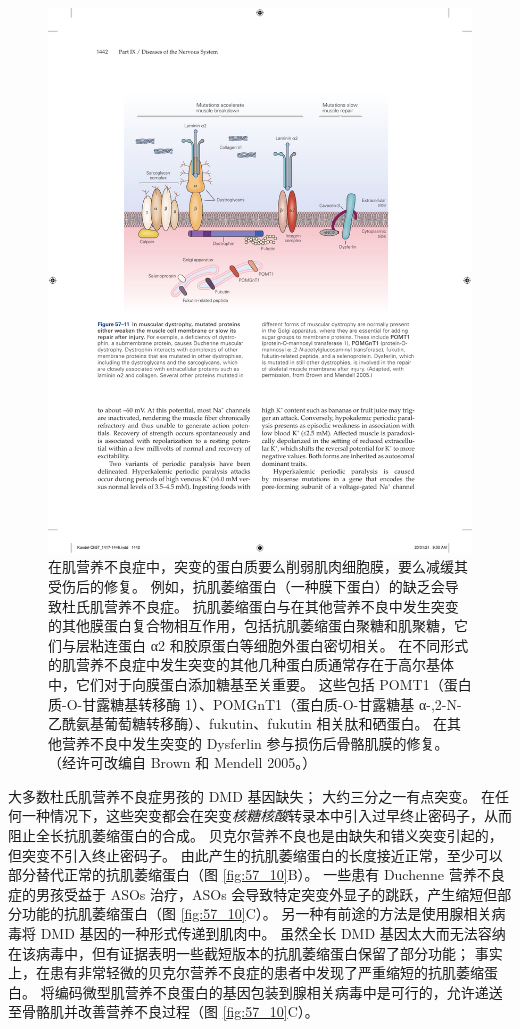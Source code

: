 \begin{figure}[htbp]
	\centering
	\includegraphics[width=0.8\linewidth]{chap57/fig_57_11}
	\caption{在肌营养不良症中，突变的蛋白质要么削弱肌肉细胞膜，要么减缓其受伤后的修复。 例如，抗肌萎缩蛋白（一种膜下蛋白）的缺乏会导致杜氏肌营养不良症。 抗肌萎缩蛋白与在其他营养不良中发生突变的其他膜蛋白复合物相互作用，包括抗肌萎缩蛋白聚糖和肌聚糖，它们与层粘连蛋白 α2 和胶原蛋白等细胞外蛋白密切相关。 在不同形式的肌营养不良症中发生突变的其他几种蛋白质通常存在于高尔基体中，它们对于向膜蛋白添加糖基至关重要。 这些包括 POMT1（蛋白质-O-甘露糖基转移酶 1）、POMGnT1（蛋白质-O-甘露糖基 α-,2-N-乙酰氨基葡萄糖转移酶）、fukutin、fukutin 相关肽和硒蛋白。 在其他营养不良中发生突变的 Dysferlin 参与损伤后骨骼肌膜的修复。 （经许可改编自 Brown 和 Mendell 2005。）}
	\label{fig:57_11}
\end{figure}


大多数杜氏肌营养不良症男孩的 DMD 基因缺失；
大约三分之一有点突变。
在任何一种情况下，这些突变都会在突变\textit{核糖核酸}转录本中引入过早终止密码子，从而阻止全长抗肌萎缩蛋白的合成。
贝克尔营养不良也是由缺失和错义突变引起的，但突变不引入终止密码子。
由此产生的抗肌萎缩蛋白的长度接近正常，至少可以部分替代正常的抗肌萎缩蛋白（图 \ref{fig:57_10}B）。
一些患有 Duchenne 营养不良症的男孩受益于 ASOs 治疗，ASOs 会导致特定突变外显子的跳跃，产生缩短但部分功能的抗肌萎缩蛋白（图 \ref{fig:57_10}C）。
另一种有前途的方法是使用腺相关病毒将 DMD 基因的一种形式传递到肌肉中。
虽然全长 DMD 基因太大而无法容纳在该病毒中，但有证据表明一些截短版本的抗肌萎缩蛋白保留了部分功能；
事实上，在患有非常轻微的贝克尔营养不良症的患者中发现了严重缩短的抗肌萎缩蛋白。
将编码微型肌营养不良蛋白的基因包装到腺相关病毒中是可行的，允许递送至骨骼肌并改善营养不良过程（图 \ref{fig:57_10}C）。


